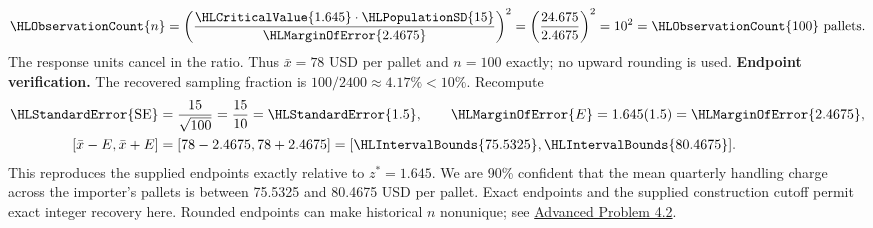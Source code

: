 \[\HLObservationCount{n}=\left(\frac{\HLCriticalValue{1.645}\cdot\HLPopulationSD{15}}{\HLMarginOfError{2.4675}}\right)^2=\left(\frac{24.675}{2.4675}\right)^2=10^2=\HLObservationCount{100}\text{ pallets}.\]
The response units cancel in the ratio. Thus $\bar x=78$ USD per pallet and $n=100$ exactly; no upward rounding is used.
\textbf{Endpoint verification.} The recovered sampling fraction is $100/2400\approx 4.17\%<10\%$. Recompute
\[\begin{aligned}
\HLStandardError{\mathrm{SE}}&=\frac{15}{\sqrt{100}}=\frac{15}{10}=\HLStandardError{1.5},\qquad \HLMarginOfError{E}=1.645(1.5)=\HLMarginOfError{2.4675},\\
[\bar x-E,\bar x+E]&=[78-2.4675,78+2.4675]=[\HLIntervalBounds{75.5325},\HLIntervalBounds{80.4675}].
\end{aligned}\]
This reproduces the supplied endpoints exactly relative to $z^*=1.645$. We are 90\% confident that the mean quarterly handling charge across the importer's pallets is between 75.5325 and 80.4675 USD per pallet.
Exact endpoints and the supplied construction cutoff permit exact integer recovery here. Rounded endpoints can make historical $n$ nonunique; see \hyperref[prob:c4-advanced-2]{Advanced Problem 4.2}.
\clearpage
